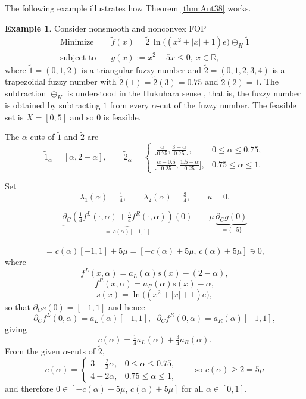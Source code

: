 \documentclass{article}
\theoremstyle{definition}
\newtheorem{example}[maar]{Example}
\begin{document}
The following example illustrates how Theorem \ref{thm:Ant38}  works.
\begin{example}{\cite{Ant}}\label{ex:FOP1}
Consider nonsmooth and nonconvex FOP
\[
  \begin{aligned}
    \text{Minimize}\quad &
       \widetilde f(x)
       =\widetilde 2\,\ln\!\bigl((x^{2}+|x|+1)e\bigr)\ominus_{H}\widetilde 1\\
    \text{subject to}\quad &
       g(x):=x^{2}-5x\le 0,\ x\in \mathbb R,
  \end{aligned}
\]
where $\widetilde 1=(0,1,2)$ is a triangular fuzzy number and
$\widetilde 2=(0,1,2,3,4)$ is a trapezoidal fuzzy number with
$\widetilde 2(1)=\widetilde 2(3)=0.75$ and $\widetilde 2(2)=1$.  
The subtraction $\ominus_H$ is understood in the Hukuhara sense \cite{Hukuhara}, that is, the fuzzy number is obtained by subtracting $1$ from every $\alpha$-cut of the fuzzy number. The feasible set is $X=[0,5]$ and so $0$ is feasible.

The $\alpha$‑cuts of $\widetilde 1$ and $\widetilde 2$ are
\[
  \widetilde 1_{\alpha}=[\alpha,2-\alpha],\qquad
  \widetilde 2_{\alpha}=
  \begin{cases}
    \bigl[\frac{\alpha}{0.75},\frac{3-\alpha}{0.75}\bigr], & 0\le\alpha\le 0.75,\\[4pt]
    \bigl[\frac{\alpha-0.5}{0.25},\frac{1.5-\alpha}{0.25}\bigr], & 0.75\le\alpha\le 1.
  \end{cases}
\]

Set
\[
  \lambda_1(\alpha)=\tfrac14,\qquad \lambda_2(\alpha)=\tfrac34,\qquad
  u=0.
\]

\[
\underbrace{\partial_C\!\left(\tfrac14 f^{L}(\cdot,\alpha)
+\tfrac34 f^{R}(\cdot,\alpha)\right)(0)}_{=\,c(\alpha)[-1,1]}-
-\mu\,\underbrace{\partial_C g(0)}_{=\{-5\}}
\]\ 
\[\]
\[
= c(\alpha)[-1,1] + 5\mu
= [-c(\alpha)+5\mu,\,c(\alpha)+5\mu] \ni 0,
\]
where
\[
f^{L}(x,\alpha)=a_L(\alpha)s(x)-(2-\alpha), \]
\[f^{R}(x,\alpha)=a_R(\alpha)s(x)-\alpha,\]
\[s(x)=\ln\!\bigl((x^{2}+|x|+1)e\bigr),
\]
so that \(\partial_C s(0)=[-1,1]\) and hence
\[\partial_C f^{L}(0,\alpha)=a_L(\alpha)[-1,1],\; \;
\partial_C f^{R}(0,\alpha)=a_R(\alpha)[-1,1],\]
giving \[c(\alpha)=\tfrac14 a_L(\alpha)+\tfrac34 a_R(\alpha).\]
From the given \(\alpha\)-cuts of \(\widetilde 2\),
\[
c(\alpha)=
\begin{cases}
3-\tfrac{2}{3}\alpha, & 0\le\alpha\le 0.75,\\[4pt]
4-2\alpha, & 0.75\le\alpha\le 1,
\end{cases}
\qquad\text{so } c(\alpha)\ge 2=5\mu
\]
and therefore \(0\in[-c(\alpha)+5\mu,\,c(\alpha)+5\mu]\)
for all \(\alpha\in[0,1]\).


\end{example}
\end{document}
